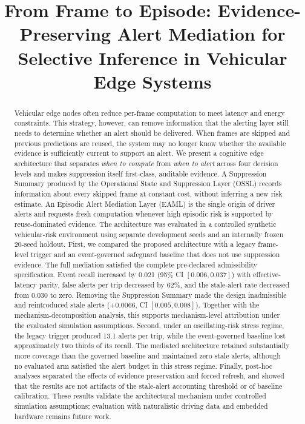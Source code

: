 \documentclass[conference]{IEEEtran}
\title{From Frame to Episode: Evidence-Preserving Alert Mediation for Selective Inference in Vehicular Edge Systems}
\author{
\IEEEauthorblockN{Anonymous Authors}
\IEEEauthorblockA{Paper submitted for double-blind review}}
\begin{document}
\maketitle

\begin{abstract}
Vehicular edge nodes often reduce per-frame computation to meet latency
and energy constraints. This strategy, however, can remove information
that the alerting layer still needs to determine whether an alert should
be delivered. When frames are skipped and previous predictions are
reused, the system may no longer know whether the available evidence is
sufficiently current to support an alert.
We present a cognitive edge architecture that separates \emph{when to
compute} from \emph{when to alert} across four decision levels and makes
suppression itself first-class, auditable evidence. A
Suppression Summary produced by the Operational State and Suppression
Layer (OSSL) records information about every skipped frame at constant
cost, without inferring a new risk estimate. An Episodic Alert Mediation
Layer (EAML) is the single origin of driver alerts and requests fresh
computation whenever high episodic risk is supported by
reuse-dominated evidence.
The architecture was evaluated in a controlled synthetic
vehicular-risk environment using separate development seeds and an
internally frozen 20-seed holdout. First, we compared the proposed
architecture with a legacy frame-level trigger and an event-governed
safeguard baseline that does not use suppression evidence. The full
mediation satisfied the complete pre-declared admissibility
specification. Event recall increased by 0.021 (95\% CI
$[0.006,0.037]$) with effective-latency parity, false alerts per trip
decreased by 62\%, and the stale-alert rate decreased from 0.030 to
zero. Removing the Suppression Summary made the design inadmissible and
reintroduced stale alerts (+0.0066, CI $[0.005,0.008]$). Together with
the mechanism-decomposition analysis, this supports mechanism-level
attribution under the evaluated simulation assumptions.
Second, under an oscillating-risk stress regime, the legacy trigger
produced 13.1 alerts per trip, while the event-governed baseline lost
approximately two thirds of its recall. The mediated architecture
retained substantially more coverage than the governed baseline and
maintained zero stale alerts, although no evaluated arm satisfied the
alert budget in this stress regime. Finally, post-hoc analyses separated
the effects of evidence preservation and forced refresh, and showed
that the results are not artifacts of the stale-alert accounting
threshold or of baseline calibration. These results validate the
architectural mechanism under controlled simulation assumptions;
evaluation with naturalistic driving data and embedded hardware remains
future work.
\end{abstract}
\end{document}
